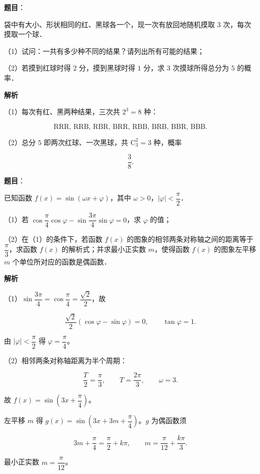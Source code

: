 \begin{answer}

\textbf{题目}：

袋中有大小、形状相同的红、黑球各一个，现一次有放回地随机摸取 $3$ 次，每次摸取一个球．

（1）试问：一共有多少种不同的结果？请列出所有可能的结果；

（2）若摸到红球时得 $2$ 分，摸到黑球时得 $1$ 分，求 $3$ 次摸球所得总分为 $5$ 的概率．

\textbf{解析}

（1）每次有红、黑两种结果，三次共 $2^3=8$ 种：

\nopagebreak[4]
\[\text{RRR, RRB, RBR, BRR, RBB, BRB, BBR, BBB}.\]

（2）总分 $5$ 即两次红球、一次黑球，共 $\mathrm C_3^2=3$ 种，概率

\nopagebreak[4]
\[\frac38.\]


\end{answer}
\begin{answer}

\textbf{题目}：

已知函数 $f(x)=\sin(\omega x+\varphi)$，其中 $\omega>0$，$|\varphi|<\dfrac\pi2$．

（1）若 $\cos\dfrac\pi4\cos\varphi-\sin\dfrac{3\pi}4\sin\varphi=0$，求 $\varphi$ 的值；

（2）在（1）的条件下，若函数 $f(x)$ 的图象的相邻两条对称轴之间的距离等于 $\dfrac\pi3$，求函数 $f(x)$ 的解析式；并求最小正实数 $m$，使得函数 $f(x)$ 的图象左平移 $m$ 个单位所对应的函数是偶函数．

\textbf{解析}

（1）$\sin\dfrac{3\pi}4=\cos\dfrac\pi4=\dfrac{\sqrt2}2$，故

\nopagebreak[4]
\[\frac{\sqrt2}2(\cos\varphi-\sin\varphi)=0,\qquad \tan\varphi=1.\]

由 $|\varphi|<\dfrac\pi2$ 得 $\varphi=\dfrac\pi4$。

（2）相邻两条对称轴距离为半个周期：

\nopagebreak[4]
\[\frac T2=\frac\pi3,\qquad T=\frac{2\pi}3,\qquad \omega=3.\]

故 $f(x)=\sin\left(3x+\dfrac\pi4\right)$。

左平移 $m$ 得 $g(x)=\sin\left(3x+3m+\dfrac\pi4\right)$。$g$ 为偶函数须

\nopagebreak[4]
\[3m+\frac\pi4=\frac\pi2+k\pi,\qquad m=\frac\pi{12}+\frac{k\pi}3.\]

最小正实数 $m=\dfrac\pi{12}$。


\end{answer}
